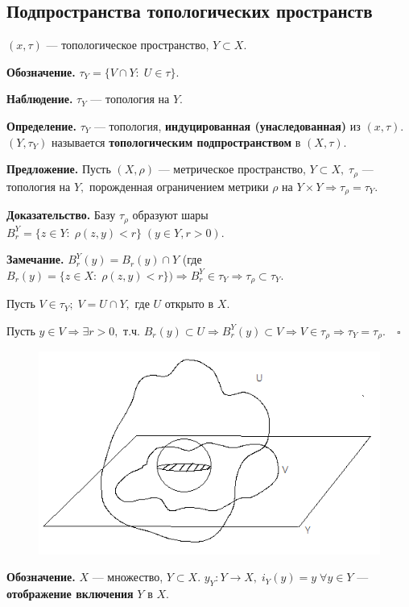 \documentclass[12pt,a4paper]{article}
\begin{document}
\subsection{Подпространства топологических пространств} 

$(x, \tau)$ --- топологическое пространство, $Y \subset X.$ 

\textbf{Обозначение.} $\tau_{Y} = \{V \cap Y: \; U \in \tau\}.$ 

\textbf{Наблюдение.} $\tau_{Y}$ --- топология на $Y.$ 

\textbf{Определение.} $\tau_{Y}$ --- топология, \textbf{индуцированная (унаследованная)} из $(x, \tau).$ $(Y, \tau_{Y})$ называется \textbf{топологическим подпространством} в $(X, \tau).$

\textbf{Предложение.} Пусть $(X, \rho)$ --- метрическое пространство, $Y \subset X, \; \tau_{\rho}$ --- топология на $Y,$ порожденная ограничением метрики $\rho$ на $Y \times Y \Rightarrow \tau_{\rho} = \tau_{Y}.$ 

\textbf{Доказательство.} Базу $\tau_{\rho}$ образуют шары $B_{r}^{Y} = \{z \in Y: \; \rho(z, y) < r\} \; (y \in Y, r > 0).$ 

\textbf{Замечание.} $B_{r}^{Y}(y) = B_{r}(y) \cap Y$ (где $B_{r}(y) = \{z \in X: \; \rho(z, y) < r\}) \Rightarrow B_{r}^{Y} \in \tau_{Y} \Rightarrow \tau_{\rho} \subset \tau_{Y}.$ 

Пусть $V \in \tau_{Y}; \; V = U \cap Y,$ где $U$ открыто в $X.$ 

Пусть $y \in V \Rightarrow \exists r > 0,$ т.ч. $B_{r}(y) \subset U \Rightarrow B_{r}^{Y}(y) \subset V \Rightarrow V \in \tau_{\rho} \Rightarrow \tau_{Y} = \tau_{\rho}. \quad \square$ 

\begin{figure}[htpb]
	\centering
	\includegraphics[width=0.6\linewidth]{lect5_4.png}
\end{figure}

\textbf{Обозначение.} $X$ --- множество, $Y \subset X.$ $y_{Y}: Y \to X, \; i_{Y}(y) = y \; \forall y \in Y$ --- \textbf{отображение включения} $Y$ в $X.$ 
\end{document}
